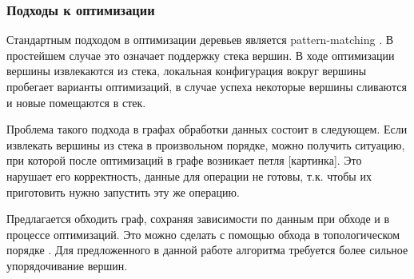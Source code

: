 \subsubsection{Подходы к оптимизации}

Стандартным подходом в оптимизации деревьев является pattern-matching \cite{pattern}. В простейшем случае это означает поддержку стека вершин. В ходе оптимизации вершины извлекаются из стека, локальная конфигурация вокруг вершины пробегает варианты оптимизаций, в случае успеха некоторые вершины сливаются и новые помещаются в стек.

Проблема такого подхода в графах обработки данных состоит в следующем. Если извлекать вершины из стека в произвольном порядке, можно получить ситуацию, при которой после оптимизаций в графе возникает петля [картинка]. Это нарушает его корректность, данные для операции не готовы, т.к. чтобы их приготовить нужно запустить эту же операцию.

Предлагается обходить граф, сохраняя зависимости по данным при обходе и в процессе оптимизаций. Это можно сделать с помощью обхода в топологическом порядке \cite{flume}. Для предложенного в данной работе алгоритма требуется более сильное упорядочивание вершин.
